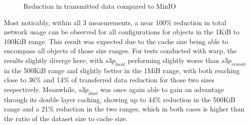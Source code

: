 \bandwidthlocs
\pgfplotstabletranspose[colnames from=colnames]\Tbandwidthlocs{\bandwidthlocs}

\bandwidthrems
\pgfplotstabletranspose[colnames from=colnames]\Tbandwidthrems{\bandwidthrems}

\bandwidthduo
\pgfplotstabletranspose[colnames from=colnames]\Tbandwidthduo{\bandwidthduo}


\begin{figure}[h!]
	\centering
	\caption{Reduction in transmitted data compared to MinIO}
	\label{fig:bandwidth}
\end{figure}

Most noticably, within all 3 measurements, a near 100\% reduction in total network usage can be observed for all configurations for objects in the 1KiB to 100KiB range. This result was expected due to the cache size being able to encompass all objects of those size ranges.
For tests conducted with warp, the results slightly diverge here, with ${s3p}_{local}$ performing slightly worse than ${s3p}_{remote}$ in the 500KiB range and slightly better in the 1MiB range, with both reaching close to 36\% and 14\% of transferred data reduction for those two sizes respectively. Meanwhile, ${s3p}_{dual}$  was once again able to gain an advantage through its double layer caching, showing up to 44\% reduction in  the 500KiB range and a 21\% reduction in the two ranges, which in both cases is higher than the ratio of the dataset size to cache size.

